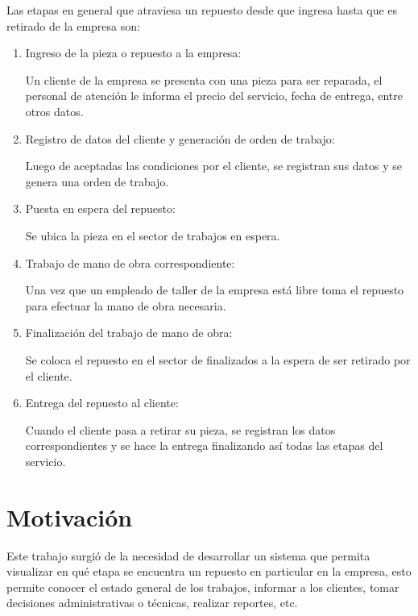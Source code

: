 Las etapas en general que atraviesa un repuesto desde que ingresa hasta que es retirado de la empresa son:
\begin{enumerate}
\item Ingreso de la pieza o repuesto a la empresa: 	

Un cliente de la empresa se presenta con una pieza para ser reparada, el personal de atención le informa el precio del servicio, fecha de entrega, entre otros datos.

\item Registro de datos del cliente y generación de orden de trabajo:

Luego de aceptadas las condiciones por el cliente, se registran sus datos y se genera una orden de trabajo.

\item Puesta en espera del repuesto:

Se ubica la pieza en el sector de trabajos en espera.

\item Trabajo de mano de obra correspondiente:

Una vez que un empleado de taller de la empresa está libre toma el repuesto para efectuar la mano de obra necesaria.

\item Finalización del trabajo de mano de obra:

Se coloca el repuesto en el sector de finalizados a la espera de ser retirado por el cliente.

\item Entrega del repuesto al cliente:

Cuando el cliente pasa a retirar su pieza, se registran los datos correspondientes y se hace la entrega finalizando así todas las etapas del servicio.

\end{enumerate}


\section{Motivación}

Este trabajo surgió de la necesidad de desarrollar un sistema que permita visualizar en qué etapa se encuentra un repuesto en particular en la empresa, esto permite conocer el estado general de los trabajos, informar a los clientes, tomar decisiones administrativas o técnicas, realizar reportes, etc. 

